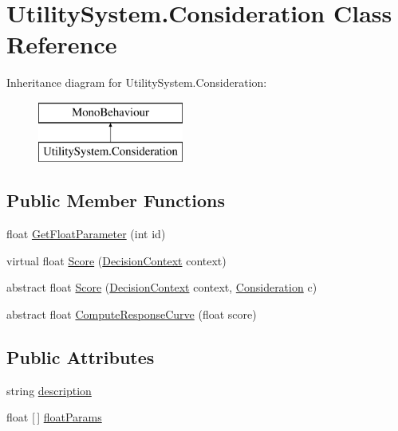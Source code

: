 \hypertarget{class_utility_system_1_1_consideration}{}\section{Utility\+System.\+Consideration Class Reference}
\label{class_utility_system_1_1_consideration}
Inheritance diagram for Utility\+System.\+Consideration\+:\begin{figure}[H]
\begin{center}
\leavevmode
\includegraphics[height=2.000000cm]{class_utility_system_1_1_consideration}
\end{center}
\end{figure}
\subsection*{Public Member Functions}
\begin{DoxyCompactItemize}
\item 
float \mbox{\hyperlink{class_utility_system_1_1_consideration_a06aa9c595c6f247b429028b3d64480b9}{Get\+Float\+Parameter}} (int id)
\item 
virtual float \mbox{\hyperlink{class_utility_system_1_1_consideration_afe926b80ef5f4780b788e6bae93ac89e}{Score}} (\mbox{\hyperlink{class_utility_system_1_1_decision_context}{Decision\+Context}} context)
\item 
abstract float \mbox{\hyperlink{class_utility_system_1_1_consideration_a1340c371b0e917253e906b48b5c3b187}{Score}} (\mbox{\hyperlink{class_utility_system_1_1_decision_context}{Decision\+Context}} context, \mbox{\hyperlink{class_utility_system_1_1_consideration}{Consideration}} c)
\item 
abstract float \mbox{\hyperlink{class_utility_system_1_1_consideration_a899a8fdb51b9e7c82f4a52e8bfb4aba9}{Compute\+Response\+Curve}} (float score)
\end{DoxyCompactItemize}
\subsection*{Public Attributes}
\begin{DoxyCompactItemize}
\item 
string \mbox{\hyperlink{class_utility_system_1_1_consideration_aea5bafaa7a2cb6b8d8dda059e7cbc452}{description}}
\item 
float \mbox{[}$\,$\mbox{]} \mbox{\hyperlink{class_utility_system_1_1_consideration_aab4d2dc6c9084d5684a53b2cc2c7c0c7}{float\+Params}}
\end{DoxyCompactItemize}


